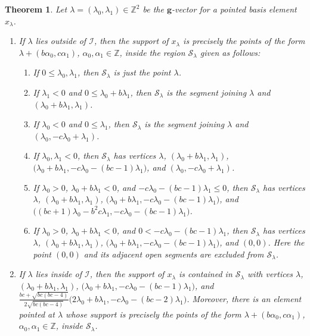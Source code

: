 \documentclass[pdflatex,sn-mathphys]{sn-jnl}%
\theoremstyle{thmstyleone}%
\newtheorem{theorem}{Theorem}[section]%
\theoremstyle{thmstyletwo}%
\theoremstyle{thmstylethree}%
\newcommand{\bfg}{\boldsymbol{g}}
\newcommand{\cI}{\mathcal{I}}
\newcommand{\cS}{\mathcal{S}}
\newcommand{\ZZ}{\mathbb{Z}}
\begin{document}
  \begin{theorem}
    \label{th:maximum support}
    Let $\lambda=(\lambda_0,\lambda_1)\in\ZZ^2$ be the $\bfg$-vector for a pointed basis element $x_\lambda$.
    \begin{enumerate}
      \item If $\lambda$ lies outside of $\cI$, then the support of $x_\lambda$ is precisely the points of the form $\lambda+(b \alpha_0 ,c \alpha_1)$, $\alpha_0,\alpha_1\in\ZZ$, inside the region $\cS_\lambda$ given as follows:
        \begin{enumerate}
          \item If $0\le\lambda_0,\lambda_1$, then $\cS_\lambda$ is just the point $\lambda$.
          \item If $\lambda_1 < 0$ and $0\le\lambda_0+b\lambda_1$, then $\cS_\lambda$ is the segment joining $\lambda$ and $(\lambda_0+b\lambda_1,\lambda_1)$.
          \item If $\lambda_0 < 0$ and $0\le\lambda_1$, then $\cS_\lambda$ is the segment joining $\lambda$ and $(\lambda_0,-c\lambda_0+\lambda_1)$.
          \item If $\lambda_0,\lambda_1 < 0$, then $\cS_\lambda$ has  vertices $\lambda$, $(\lambda_0+b\lambda_1,\lambda_1)$, $\big(\lambda_0+b\lambda_1,-c\lambda_0-(bc-1)\lambda_1\big)$, and ${(\lambda_0,-c\lambda_0+\lambda_1)}$.
          \item If $\lambda_0 > 0$, $\lambda_0+b\lambda_1 < 0$, and $-c\lambda_0-(bc-1)\lambda_1\le 0$, then $\cS_\lambda$ has  vertices $\lambda$, $(\lambda_0+b\lambda_1,\lambda_1)$, $\big(\lambda_0+b\lambda_1,-c\lambda_0-(bc-1)\lambda_1\big)$, and $\big((bc+1)\lambda_0-b^2c\lambda_1,-c\lambda_0-(bc-1)\lambda_1\big)$.
          \item If $\lambda_0 > 0$, $\lambda_0+b\lambda_1 < 0$, and $0 < -c\lambda_0-(bc-1)\lambda_1$, then $\cS_\lambda$ has  vertices $\lambda$, $(\lambda_0+b\lambda_1,\lambda_1)$, $\big(\lambda_0+b\lambda_1,-c\lambda_0-(bc-1)\lambda_1\big)$, and $(0,0)$.  Here the point $(0,0)$ and its adjacent open segments are excluded from $\cS_\lambda$.
        \end{enumerate}
      \item If $\lambda$ lies inside of $\cI$, then the support of $x_\lambda$ is contained in $\cS_\lambda$ with  vertices $\lambda$, $(\lambda_0+b\lambda_1,\lambda_1)$, $\big(\lambda_0+b\lambda_1,-c\lambda_0-(bc-1)\lambda_1\big)$, and $\frac{bc+\sqrt{bc(bc-4)}}{2\sqrt{bc(bc-4)}}\big(2\lambda_0+b\lambda_1,-c\lambda_0-(bc-2)\lambda_1\big)$.
        Moreover, there is an element pointed at $\lambda$ whose support is precisely the points of the form $\lambda+(b \alpha_0 ,c \alpha_1)$, $\alpha_0,\alpha_1\in\ZZ$, inside $\cS_\lambda$.
    \end{enumerate}
  \end{theorem}
\end{document}
